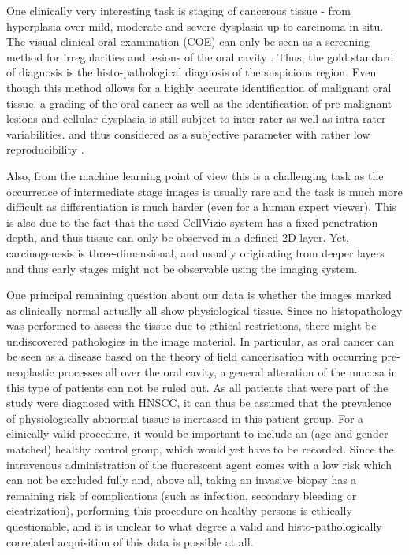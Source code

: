 \documentclass[fleqn,10pt]{wlscirep}
\begin{document}
One clinically very interesting task is staging of cancerous tissue - from hyperplasia over mild, moderate and severe dysplasia up
to carcinoma in situ\cite{Keith:2013jm}.
The visual clinical oral examination (COE) can only be seen as a screening method for irregularities and lesions of the oral cavity \cite{Cleveland:2013gc}.
Thus, the gold standard of diagnosis is the histo-pathological diagnosis of the suspicious region. Even though this method allows for a highly accurate identification of malignant oral tissue, a grading of the oral cancer as well as the identification of pre-malignant lesions and cellular dysplasia is still subject to inter-rater as well as intra-rater variabilities. and thus considered as a subjective parameter with rather low reproducibility \cite{Abbey:1995kd}.

Also, from the machine learning point of view this is a challenging task as the occurrence of intermediate stage images is usually rare and the task is much more difficult as differentiation is much harder (even for a human expert viewer). This is also due to the fact that the used CellVizio system has a fixed penetration depth, and thus tissue can only be observed in a defined 2D layer. Yet, carcinogenesis is three-dimensional, and usually originating from deeper layers and thus early stages might not be observable using the imaging system.

One principal remaining question about our data is whether the images marked as clinically normal actually all show physiological tissue.  Since no histopathology was performed to assess the tissue due to ethical restrictions, there might be undiscovered pathologies in the image material. In particular, as oral cancer can be seen as a disease based on the theory of field cancerisation with occurring pre-neoplastic processes all over the oral cavity, a general alteration of the mucosa in this type of patients can not be ruled out. As all patients that were part of the study were diagnosed with HNSCC, it can thus be assumed that the prevalence of physiologically abnormal tissue is increased in this patient group. For a clinically valid procedure, it would be important to include an (age and gender matched) healthy control group, which would yet have to be recorded. Since the intravenous administration of the fluorescent agent comes with a low risk which can not be excluded fully and, above all, taking an invasive biopsy has a remaining risk of complications (such as infection, secondary bleeding or cicatrization), performing this procedure on healthy persons is ethically questionable, and it is unclear to what degree a valid and histo-pathologically correlated acquisition of this data is possible at all.
\end{document}
